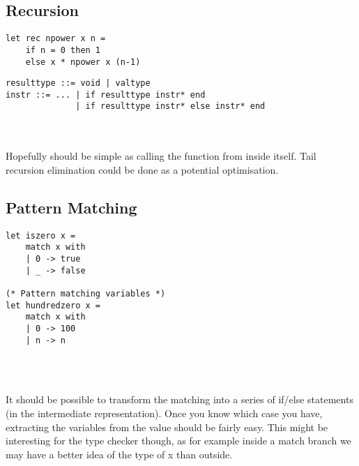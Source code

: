 \documentclass{report}
\begin{document}
\subsection{Recursion}
\begin{minipage}{0.4\linewidth}
\begin{verbatim}
let rec npower x n =
    if n = 0 then 1
    else x * npower x (n-1)
\end{verbatim}
\end{minipage}  
\begin{minipage}{0.6\linewidth}
\begin{verbatim}
resulttype ::= void | valtype
instr ::= ... | if resulttype instr* end
              | if resulttype instr* else instr* end
\end{verbatim}
\end{minipage}
\\\\
Hopefully should be simple as calling the function from inside itself. Tail recursion elimination could be done as a potential optimisation.

\subsection{Pattern Matching}
\begin{minipage}{0.4\linewidth}
\begin{verbatim}
let iszero x =
    match x with
    | 0 -> true
    | _ -> false

(* Pattern matching variables *)
let hundredzero x =
    match x with
    | 0 -> 100
    | n -> n
\end{verbatim}
\end{minipage}  
\begin{minipage}{0.6\linewidth}
\begin{verbatim}

\end{verbatim}
\end{minipage}
\\\\
It should be possible to transform the matching into a series of if/else statements (in the intermediate representation). Once you know which case you have, extracting the variables from the value should be fairly easy. This might be interesting for the type checker though, as for example inside a match branch we may have a better idea of the type of x than outside.
\end{document}
